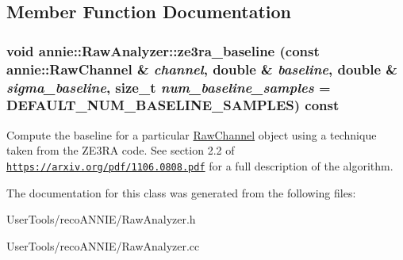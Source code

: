 \subsection{Member Function Documentation}
\hypertarget{classannie_1_1RawAnalyzer_a33d2f06b95aa38e099d735809a80c085}{
\subsubsection[{ze3ra\_\-baseline}]{\setlength{\rightskip}{0pt plus 5cm}void annie::RawAnalyzer::ze3ra\_\-baseline (const {\bf annie::RawChannel} \& {\em channel}, \/  double \& {\em baseline}, \/  double \& {\em sigma\_\-baseline}, \/  size\_\-t {\em num\_\-baseline\_\-samples} = {\ttfamily DEFAULT\_\-NUM\_\-BASELINE\_\-SAMPLES}) const}}
\label{classannie_1_1RawAnalyzer_a33d2f06b95aa38e099d735809a80c085}


Compute the baseline for a particular \hyperlink{classannie_1_1RawChannel}{RawChannel} object using a technique taken from the ZE3RA code. See section 2.2 of \href{https://arxiv.org/pdf/1106.0808.pdf}{\tt https://arxiv.org/pdf/1106.0808.pdf} for a full description of the algorithm. 

The documentation for this class was generated from the following files:\begin{DoxyCompactItemize}
\item 
UserTools/recoANNIE/RawAnalyzer.h\item 
UserTools/recoANNIE/RawAnalyzer.cc\end{DoxyCompactItemize}
